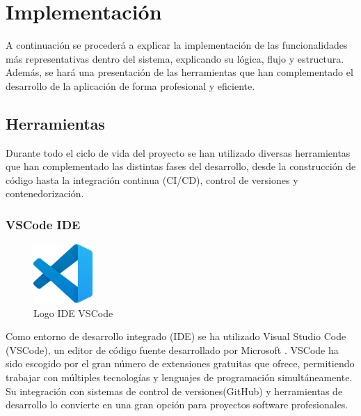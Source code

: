 \chapter{Implementación} \label{diseño}

A continuación se procederá a explicar la implementación de las funcionalidades más representativas dentro del sistema, explicando su lógica, flujo y estructura. Además, se hará una presentación de las herramientas que han complementado el desarrollo de la aplicación de forma profesional y eficiente.

\section{Herramientas}

Durante todo el ciclo de vida del proyecto se han utilizado diversas herramientas que han complementado las distintas fases del desarrollo, desde la construcción de código hasta la integración continua (CI/CD), control de versiones y contenedorización.

\subsection{VSCode IDE}
\begin{figure}[H]
  \centering
  \includegraphics[width=0.2\textwidth]{fotos/vs.png}
  \caption{Logo IDE VSCode}
\end{figure}
Como entorno de desarrollo integrado (IDE) se ha utilizado Visual Studio Code (VSCode), un editor de código fuente desarrollado por Microsoft \cite{vscode}. VSCode ha sido escogido por el gran número de extensiones gratuitas que ofrece, permitiendo trabajar con múltiples tecnologías y lenguajes de programación simultáneamente. Su integración con sistemas de control de versiones(GitHub) y herramientas de desarrollo lo convierte en una gran opción para proyectos software profesionales.

